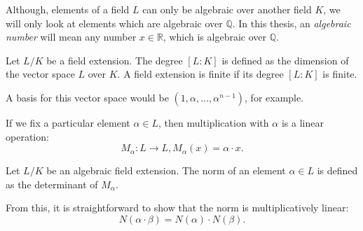 Although, elements of a field $L$ can only be algebraic over another field $K$,
we will only look at elements which are algebraic over $ℚ$.
In this thesis, an \emph{algebraic number} will mean any number $x ∈ ℝ$, which
is algebraic over $ℚ$.

\begin{definition}
  Let $L/K$ be a field extension.
  The degree $[L : K]$ is defined as the dimension of the vector space $L$ over $K$.
  A field extension is finite if its degree $[L : K]$ is finite.
\end{definition}

A basis for this vector space would be $(1, α, …, α^{n-1})$, for example.

If we fix a particular element $α ∈ L$, then multiplication with $α$ is a linear operation:
\[
  M_α : L → L, M_α(x) = α · x.
\]

\begin{definition}
  Let $L/K$ be an algebraic field extension.
  The norm of an element $α ∈ L$ is defined as the determinant of $M_α$.
\end{definition}

From this, it is straightforward to show that the norm is multiplicatively linear:
\[
  N(α · β) = N(α) · N(β).
\]
